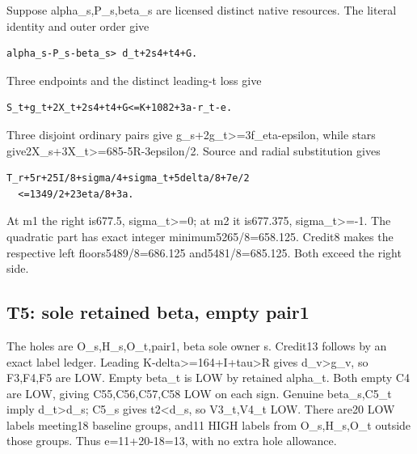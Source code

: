 \documentclass[10pt,a4paper]{article}
\theoremstyle{definition}
\begin{document}
Suppose alpha\_\allowbreak{}s,\allowbreak{}P\_\allowbreak{}s,\allowbreak{}beta\_\allowbreak{}s are licensed distinct native resources.
The literal identity and outer order give

\begin{lstlisting}
alpha_s-P_s-beta_s> d_t+2s4+t4+G.
\end{lstlisting}

Three endpoints and the distinct leading-t loss give

\begin{lstlisting}
S_t+g_t+2X_t+2s4+t4+G<=K+1082+3a-r_t-e.
\end{lstlisting}

Three disjoint ordinary pairs give
g\_\allowbreak{}s+\allowbreak{}2g\_\allowbreak{}t\textgreater=\allowbreak{}3f\_\allowbreak{}eta-epsilon,\allowbreak{} while stars
give2X\_\allowbreak{}s+\allowbreak{}3X\_\allowbreak{}t\textgreater=\allowbreak{}685-5R-3epsilon/2. Source and radial
substitution gives

\begin{lstlisting}
T_r+5r+25I/8+sigma/4+sigma_t+5delta/8+7e/2
  <=1349/2+23eta/8+3a.
\end{lstlisting}

At m1 the right is677.5,\allowbreak{} sigma\_\allowbreak{}t\textgreater=\allowbreak{}0; at m2 it is677.375,\allowbreak{}
sigma\_\allowbreak{}t\textgreater=\allowbreak{}-1. The quadratic part has exact integer
minimum5265/8=\allowbreak{}658.125. Credit8 makes the respective left
floors5489/8=\allowbreak{}686.125 and5481/8=\allowbreak{}685.125. Both exceed the right side.

\hypertarget{t5-sole-retained-beta-empty-pair1}{%
\subsection{T5: sole retained beta,\allowbreak{} empty
pair1}\label{t5-sole-retained-beta-empty-pair1}}

The holes are O\_\allowbreak{}s,\allowbreak{}H\_\allowbreak{}s,\allowbreak{}O\_\allowbreak{}t,\allowbreak{}pair1,\allowbreak{} beta sole owner s. Credit13 follows
by an exact label ledger. Leading
K-delta\textgreater=\allowbreak{}164+\allowbreak{}I+\allowbreak{}tau\textgreater R gives d\_\allowbreak{}v\textgreater g\_\allowbreak{}v,\allowbreak{}
so F3,\allowbreak{}F4,\allowbreak{}F5 are LOW. Empty beta\_\allowbreak{}t is LOW by retained alpha\_\allowbreak{}t. Both
empty C4 are LOW,\allowbreak{} giving C55,\allowbreak{}C56,\allowbreak{}C57,\allowbreak{}C58 LOW on each sign. Genuine
beta\_\allowbreak{}s,\allowbreak{}C5\_\allowbreak{}t imply d\_\allowbreak{}t\textgreater d\_\allowbreak{}s; C5\_\allowbreak{}s gives t2\textless d\_\allowbreak{}s,\allowbreak{}
so V3\_\allowbreak{}t,\allowbreak{}V4\_\allowbreak{}t LOW. There are20 LOW labels meeting18 baseline groups,\allowbreak{}
and11 HIGH labels from O\_\allowbreak{}s,\allowbreak{}H\_\allowbreak{}s,\allowbreak{}O\_\allowbreak{}t outside those groups. Thus
e=\allowbreak{}11+\allowbreak{}20-18=\allowbreak{}13,\allowbreak{} with no extra hole allowance.
\end{document}
